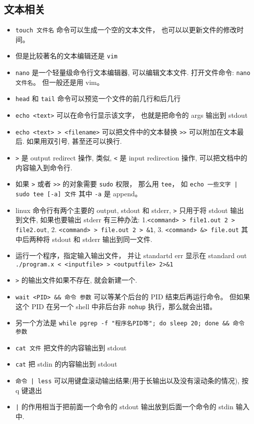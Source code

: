 \subsection{文本相关}
\begin{itemize}
\item \verb`touch 文件名` 命令可以生成一个空的文本文件， 也可以以更新文件的修改时间。
\item 但是比较著名的文本编辑还是 \verb|vim|
\item \verb`nano` 是一个轻量级命令行文本编辑器, 可以编辑文本文件. 打开文件命令: \verb`nano 文件名`。 但一般还是用 vim。
\item \verb`head` 和 \verb`tail` 命令可以预览一个文件的前几行和后几行
\item \verb`echo <text>` 可以在命令行显示该文字， 也就是把命令的 args 输出到 stdout
\item \verb`echo <text> > <filename>` 可以把文件中的文本替换 \verb`>>` 可以附加在文本最后. 如果用双引号, 甚至还可以换行.
\item \verb`>` 是 output redirect 操作, 类似, \verb`<` 是 input redirection 操作, 可以把文档中的内容输入到命令行.
\item 如果 \verb|>| 或者 \verb|>>| 的对象需要 \verb|sudo| 权限， 那么用 \verb|tee|， 如 \verb`echo 一些文字 | sudo tee [-a] 文件` 其中 \verb|-a| 是 append。
\item linux 命令行有两个主要的 output, stdout 和 stderr, \verb`>` 只用于将 stdout 输出到文件, 如果也要输出 stderr 有三种办法: 1.\verb`<command> > file1.out 2 > file2.out`, 2. \verb`<command> > file.out 2 > &1`, 3. \verb`<command> &> file.out` 其中后两种将 stdout 和 stderr 输出到同一文件.
\item 运行一个程序，指定输入输出文件， 并让 standartd err 显示在 standard out \verb`./program.x < <inputfile> > <outputfile> 2>&1` 
\item \verb`>` 的输出文件如果不存在, 就会新建一个.
\item \verb|wait <PID> && 命令 参数| 可以等某个后台的 PID 结束后再运行命令。 但如果这个 PID 在另一个 shell 中非后台非 \verb|nohup| 执行，那么就会出错。
\item 另一个方法是 \verb|while pgrep -f "程序名PID等"; do sleep 20; done && 命令 参数|
\item  \verb`cat 文件` 把文件的内容输出到 stdout
\item  \verb`cat` 把 stdin 的内容输出到 stdout
\item \verb`命令 | less` 可以用键盘滚动输出结果(用于长输出以及没有滚动条的情况), 按 q 键退出
\item \verb`|` 的作用相当于把前面一个命令的 stdout 输出放到后面一个命令的 stdin 输入中.

\end{itemize}
